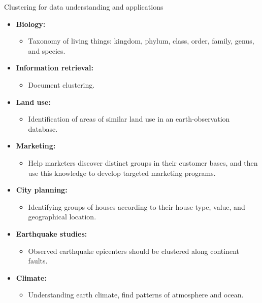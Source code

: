 \documentclass[aspectratio=169,t,xcolor=dvipsnames]{beamer}
\begin{document}
  {
    \begin{frame}{Clustering for data understanding and applications}
        \begin{itemize}
          \item \textbf{Biology:}
          \begin{itemize}
            \item Taxonomy of living things: kingdom, phylum, class, order, family, genus, and species.
          \end{itemize}
          \item \textbf{Information retrieval:}
          \begin{itemize}
            \item Document clustering.
          \end{itemize}
          \item \textbf{Land use:}
          \begin{itemize}
            \item Identification of areas of similar land use in an earth-observation database.
          \end{itemize}
          \item \textbf{Marketing:}
          \begin{itemize}
            \item Help marketers discover distinct groups in their customer bases, and then use this knowledge to develop targeted marketing programs.
          \end{itemize}
          \item \textbf{City planning:}
          \begin{itemize}
            \item Identifying groups of houses according to their house type, value, and geographical location.
          \end{itemize}
          \item \textbf{Earthquake studies:}
          \begin{itemize}
            \item Observed earthquake epicenters should be clustered along continent faults.
          \end{itemize}
          \item \textbf{Climate:}
          \begin{itemize}
            \item Understanding earth climate, find patterns of atmosphere and ocean.
          \end{itemize}
        \end{itemize}
    \end{frame}
  }
\end{document}
